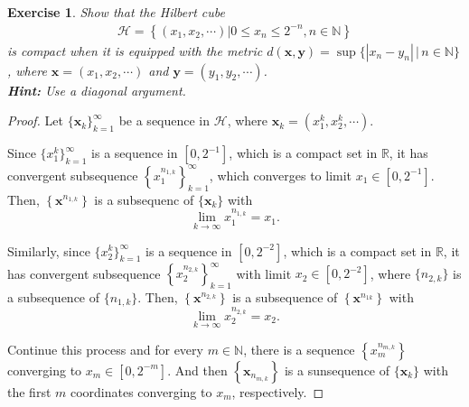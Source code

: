 \documentclass[11pt]{article}
\newtheorem{exercise}{Exercise}[section]
\theoremstyle{definition}
\numberwithin{equation}{subsection}
\begin{document}
\begin{exercise}\label{May_2017_3}
Show that the Hilbert cube
\begin{align*}
    \mathcal{H} = \left\{(x_1, x_2, \cdots) | 0 \leq x_n \leq 2^{-n}, n \in \mathbb{N} \right\}
\end{align*}
is compact when it is equipped with the metric $d(\mathbf{x}, \mathbf{y}) = \sup \{\left|x_n - y_n\right|\, |\, n \in \mathbb{N}\}$, where $\mathbf{x} = (x_1, x_2, \cdots)$ and $\mathbf{y} = (y_1, y_2, \cdots)$.\\
{\bf Hint:} Use a diagonal argument.
\end{exercise}
\begin{proof}
Let $\{\mathbf{x}_k\}^\infty_{k=1}$ be a sequence in $\mathcal{H}$, where $\mathbf{x}_k = \left(x^k_1, x^k_2, \cdots\right)$.

Since $\{x^k_1\}^\infty_{k=1}$ is a sequence in $\left[0, 2^{-1}\right]$, which is a compact set in $\mathbb{R}$, it has convergent subsequence $\left\{x^{n_{1,k}}_1\right\}^{\infty}_{k=1}$, which converges to limit $x_1 \in \left[0, 2^{-1}\right]$. Then, $\left\{\mathbf{x}^{n_{1,k}}\right\}$ is a subsequenc of $\{\mathbf{x}_k\}$ with 
$$\lim_{k \to \infty} x^{n_{1,k}}_1 = x_1.$$

Similarly, since $\{x^k_2\}^\infty_{k=1}$ is a sequence in $\left[0, 2^{-2}\right]$, which is a compact set in $\mathbb{R}$, it has convergent subsequence $\left\{x^{n_{2,k}}_2\right\}^{\infty}_{k=1}$ with limit $x_2 \in \left[0, 2^{-2}\right]$, where $\{n_{2,k}\}$ is a subsequence of $\{n_{1,k}\}$. Then, $\left\{\mathbf{x}^{n_{2,k}}\right\}$ is a subsequence of $\left\{\mathbf{x}^{n_{1k}}\right\}$ with 
$$\lim_{k \to \infty} x^{n_{2,k}}_2 = x_2.$$

Continue this process and for every $m \in \mathbb{N}$, there is a sequence $\left\{x^{n_{m,k}}_m \right\}$ converging to $x_m \in \left[0, 2^{-m}\right]$. And then $\left\{\mathbf{x}_{n_{m,k}} \right\}$ is a sunsequence of $\{\mathbf{x}_k\}$ with the first $m$ coordinates converging to $x_m$, respectively.


\end{proof}
\end{document}
